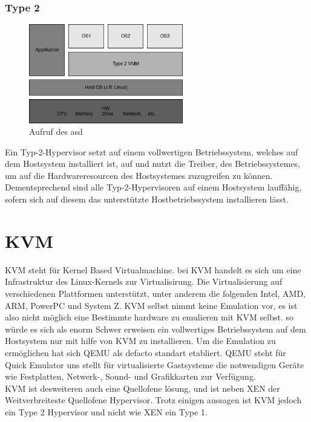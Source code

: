 \documentclass[14pt]{extreport}
\begin{document}
\subsubsection{Type 2}
\begin{figure}
	\begin{center}
		\includegraphics[width=0.6\textwidth]{png/VMMType2.png}
		\caption{Aufruf des asd}
		\label{fig:as}
	\end{center}
\end{figure}
Ein Typ-2-Hypervisor setzt auf einem vollwertigen Betriebssystem, welches auf dem Hostsystem installiert ist, auf und nutzt die Treiber, des Betriebssystemes, um auf die Hardwareresourcen des Hostsystemes zuzugreifen zu können. Dementsprechend sind alle Typ-2-Hypervisoren auf einem Hostsystem lauffähig, sofern sich auf diesem das unterstützte Hostbetriebssystem installieren lässt.
\section{KVM}
KVM steht für Kernel Based Virtualmachine. bei KVM handelt es sich um eine Infrastruktur des Linux-Kernels zur Virtualisirung. Die Virtualisierung auf verschiedenen Plattformen unterstützt, unter anderem die folgenden Intel, AMD, ARM, PowerPC und System Z. KVM selbst nimmt keine Emulation vor, es ist also nicht möglich eine Bestimmte hardware zu emulieren mit KVM selbst. so würde es sich als enorm Schwer erweisen ein vollwertiges Betriebssystem auf dem Hostsystem nur mit hilfe von KVM zu installieren. Um die Emulation zu ermöglichen hat sich QEMU als defacto standart etabliert. QEMU steht für Quick Emulator uns stellt für virtualisierte Gastsysteme die notwendigen Geräte wie Festplatten, Netwerk-, Sound- und Grafikkarten zur Verfügung.\\
KVM ist desweiteren auch eine Quellofene lösung, und ist neben XEN der Weitverbreiteste Quellofene Hypervisor. Trotz einigen aussagen ist KVM jedoch ein Type 2 Hypervisor und nicht wie XEN ein Type 1.
\end{document}
